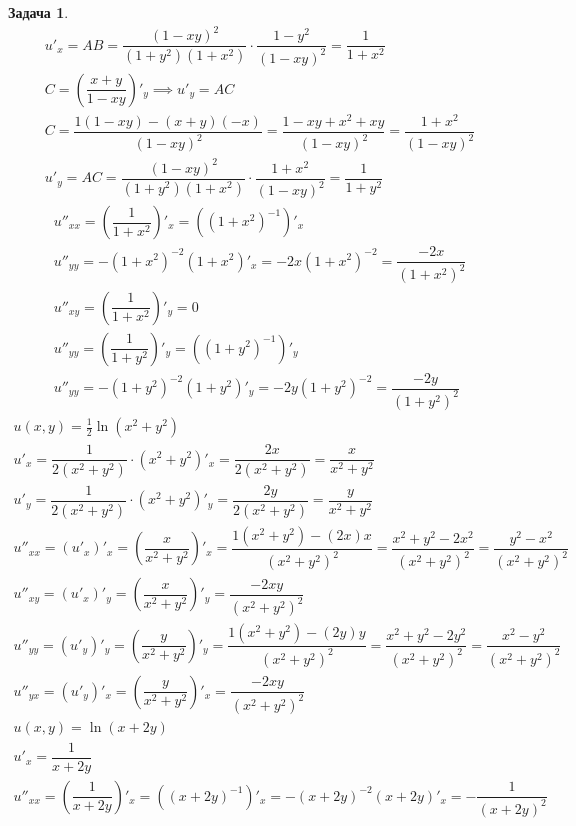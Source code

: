 \documentclass[a4paper,fleqn,12pt]{article}
\newtheorem{task}{Задача}[section]
\begin{document}
\begin{task}
\begin{gather*}
u'_x = AB =  \dfrac{(1-xy)^2}{(1 + y^2) (1 + x^2)} \cdot \dfrac {1-y^2}{(1 - xy)^2} = \dfrac{1}{1 + x^2}\\
C = \left( \dfrac{x+y}{1-xy} \right)'_y \implies u'_y = AC\\
C = \dfrac{1(1 -xy) - (x+y)(-x)}{(1 - xy)^2} = \dfrac{1 -xy + x^2 +xy}{(1 - xy)^2} = \dfrac{1 + x^2}{(1 - xy)^2}\\
u'_y = AC = \dfrac{(1-xy)^2}{(1 + y^2) (1 + x^2)} \cdot \dfrac{1 + x^2}{(1 - xy)^2} = \dfrac{1}{1 + y^2}
\end{gather*}
\begin{gather*}
u''_{xx} =\left( \dfrac{1}{1 + x^2} \right)'_x = ((1 + x^2)^{-1})'_x\\
u''_{yy}= -(1 + x^2)^{-2}(1+x^2)'_x = -2x(1 + x^2)^{-2}  = \dfrac{-2x}{(1 + x^2)^2}\\
u''_{xy} =\left( \dfrac{1}{1 + x^2} \right)'_y = 0 \\
u''_{yy} =\left( \dfrac{1}{1 + y^2} \right)'_y = ((1 + y^2)^{-1})'_y\\
u''_{yy}= -(1 + y^2)^{-2}(1+y^2)'_y = -2y(1 + y^2)^{-2}  = \dfrac{-2y}{(1 + y^2)^2}
\end{gather*}
\begin{gather*}
u(x,y) = \frac{1}{2} \ln{(x^2 + y^2)}\\
u'_x = \dfrac{1}{2(x^2 + y^2)} \cdot (x^2 + y^2)'_x = \dfrac{2x}{2(x^2 + y^2)} = \dfrac{x}{x^2 + y^2}\\
u'_y = \dfrac{1}{2(x^2 + y^2)} \cdot (x^2 + y^2)'_y = \dfrac{2y}{2(x^2 + y^2)} = \dfrac{y}{x^2 + y^2}\\
u''_{xx} = (u'_x)'_x = \left( \dfrac{x}{x^2 + y^2} \right)'_x =  \dfrac{1(x^2 + y^2) - (2x)x}{(x^2 + y^2)^2} = \dfrac{x^2 + y^2 - 2x^2}{(x^2 + y^2)^2} = \dfrac{ y^2 - x^2}{(x^2 + y^2)^2}\\
u''_{xy} = (u'_x)'_y = \left( \dfrac{x}{x^2 + y^2} \right)'_y =  \dfrac{- 2xy}{(x^2 + y^2)^2}\\
u''_{yy} = (u'_y)'_y = \left( \dfrac{y}{x^2 + y^2} \right)'_y = \dfrac{1(x^2 + y^2) - (2y)y}{(x^2 + y^2)^2} = \dfrac{x^2 + y^2 - 2y^2}{(x^2 + y^2)^2} = \dfrac{x^2 - y^2}{(x^2 + y^2)^2}\\
u''_{yx} = (u'_y)'_x = \left( \dfrac{y}{x^2 + y^2} \right)'_x = \dfrac{- 2xy}{(x^2 + y^2)^2}
\end{gather*}
\begin{gather*}
u(x,y) = \ln{(x + 2y)}\\
u'_x = \dfrac{1}{x + 2y}\\
u''_{xx} = \left( \dfrac{1}{x + 2y} \right)'_x = ((x+2y)^{-1})'_x = -(x+2y)^{-2}(x+2y)'_x = - \dfrac{1}{(x+2y)^2} \\

\end{gather*}
\end{task}
\end{document}
